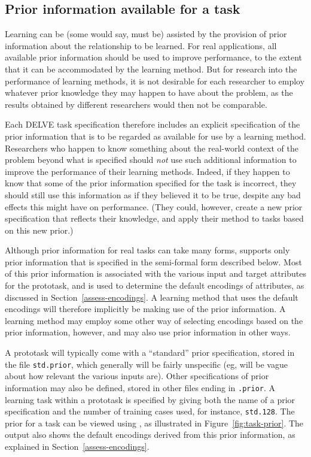 \subsection{Prior information available for a task}\label{task-prior}

Learning can be (some would say, must be) assisted by the provision of
prior information about the relationship to be learned.  For real
applications, all available prior information should be used to
improve performance, to the extent that it can be accommodated by the
learning method.  But for research into the performance of learning
methods, it is not desirable for each researcher to employ whatever
prior knowledge they may happen to have about the problem, as the
results obtained by different researchers would then not be
comparable.

Each DELVE task specification therefore includes an explicit
specification of the prior information that is to be regarded as
available for use by a learning method.  Researchers who happen to
know something about the real-world context of the problem beyond what
is specified should \emph{not} use such additional information to
improve the performance of their learning methods.  Indeed, if they
happen to know that some of the prior information specified for the
task is incorrect, they should still use this information as if they
believed it to be true, despite any bad effects this might have on
performance. (They could, however, create a new prior specification
that reflects their knowledge, and apply their method to tasks based
on this new prior.)

Although prior information for real tasks can take many forms,
\delve{} supports only prior information that is specified in the
semi-formal form described below.  Most of this prior information is
associated with the various input and target attributes for the
prototask, and is used to determine the default encodings of
attributes, as discussed in Section~\ref{assess-encodings}.  A
learning method that uses the default encodings will therefore
implicitly be making use of the prior information.  A learning method
may employ some other way of selecting encodings based on the prior
information, however, and may also use prior information in
other ways.

A prototask will typically come with a ``standard'' prior
specification, stored in the file \texttt{std.prior}, which generally
will be fairly unspecific (eg, will be vague about how relevant the
various inputs are).  Other specifications of prior information may
also be defined, stored in other files ending in \texttt{.prior}.  A
learning task within a prototask is specified by giving both the name
of a prior specification and the number of training cases used, for
instance, \texttt{std.128}.  The prior for a task can be viewed using
\dinfo{}, as illustrated in Figure~\ref{fig:task-prior}.  The output
also shows the default encodings derived from this prior information,
as explained in Section~\ref{assess-encodings}.

